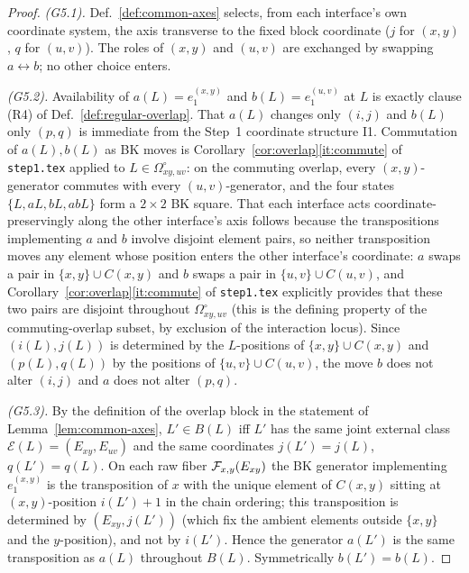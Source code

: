 \begin{proof}
\emph{(G5.1).} Def.~\ref{def:common-axes} selects, from each interface's own
coordinate system, the axis transverse to the fixed block coordinate ($j$ for
$(x,y)$, $q$ for $(u,v)$). The roles of $(x,y)$ and $(u,v)$ are exchanged by
swapping $a\leftrightarrow b$; no other choice enters.

\emph{(G5.2).} Availability of $a(L)=e_1^{(x,y)}$ and $b(L)=e_1^{(u,v)}$ at
$L$ is exactly clause (R4) of Def.~\ref{def:regular-overlap}. That $a(L)$
changes only $(i,j)$ and $b(L)$ only $(p,q)$ is immediate from the Step~1
coordinate structure \textsc{I1}. Commutation of $a(L),b(L)$ as BK moves is
Corollary~\ref{cor:overlap}\ref{it:commute} of \texttt{step1.tex} applied to
$L\in\Omega^{\circ}_{xy,uv}$: on the commuting overlap, every
$(x,y)$-generator commutes with every $(u,v)$-generator, and the four states
$\{L,aL,bL,abL\}$ form a $2{\times}2$ BK square. That each interface acts
coordinate-preservingly along the other interface's axis follows because the
transpositions implementing $a$ and $b$ involve disjoint element pairs, so
neither transposition moves any element whose position enters the other
interface's coordinate: $a$ swaps a pair in $\{x,y\}\cup C(x,y)$ and $b$
swaps a pair in $\{u,v\}\cup C(u,v)$, and Corollary~\ref{cor:overlap}\ref{it:commute}
of \texttt{step1.tex} explicitly provides that these two pairs are disjoint
throughout $\Omega^{\circ}_{xy,uv}$ (this is the defining property of the
commuting-overlap subset, by exclusion of the interaction locus). Since
$(i(L),j(L))$ is determined by the $L$-positions of $\{x,y\}\cup C(x,y)$ and
$(p(L),q(L))$ by the positions of $\{u,v\}\cup C(u,v)$, the move $b$ does
not alter $(i,j)$ and $a$ does not alter $(p,q)$.

\emph{(G5.3).} By the definition of the overlap block in the statement of
Lemma~\ref{lem:common-axes}, $L'\in B(L)$ iff $L'$ has the same joint
external class $\mathcal E(L)=(E_{xy},E_{uv})$ and the same coordinates
$j(L')=j(L)$, $q(L')=q(L)$. On each raw fiber $\mathcal{F}_{x,y}(E_{xy})$
the BK generator implementing $e_1^{(x,y)}$ is the transposition of $x$ with
the unique element of $C(x,y)$ sitting at $(x,y)$-position $i(L')+1$ in the
chain ordering; this transposition is determined by $(E_{xy},j(L'))$ (which
fix the ambient elements outside $\{x,y\}$ and the $y$-position), and not by
$i(L')$. Hence the generator $a(L')$ is the same transposition as $a(L)$
throughout $B(L)$. Symmetrically $b(L')=b(L)$.
\end{proof}

